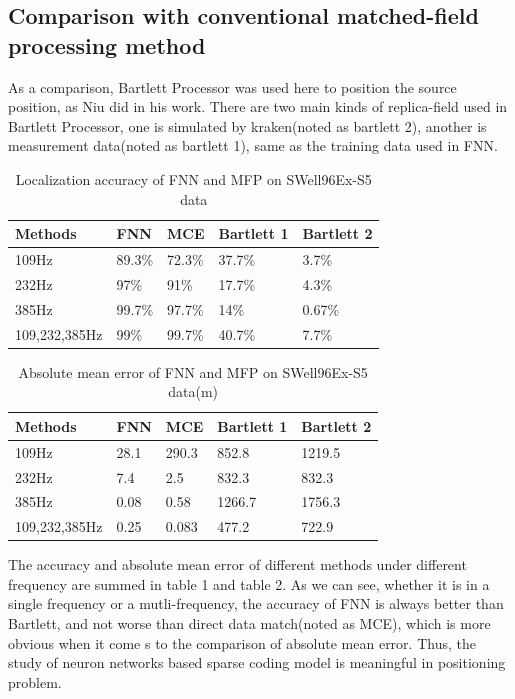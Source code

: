 \subsection{Comparison with conventional matched-field processing method}
As a comparison, Bartlett Processor was used here to position the source position, as Niu did in his work. There are two main kinds of replica-field used in Bartlett Processor, one is simulated by kraken(noted as bartlett 2), another is measurement data(noted as bartlett 1), same as the training data used in FNN.
\begin{table}[]
\caption{Localization accuracy of FNN and MFP on SWell96Ex-S5 data}
\label{my-label}
\begin{tabular}{@{}lllll@{}}
\toprule
Methods       & FNN    & MCE    & Bartlett 1 & Bartlett 2 \\ \midrule
109Hz         & 89.3\% & 72.3\% & 37.7\%     & 3.7\%      \\
232Hz         & 97\%   & 91\%   & 17.7\%     & 4.3\%      \\
385Hz         & 99.7\% & 97.7\% & 14\%       & 0.67\%     \\
109,232,385Hz & 99\%   & 99.7\% & 40.7\%     & 7.7\%      \\ \bottomrule
\end{tabular}
\end{table}

\begin{table}[]
\caption{Absolute mean error of FNN and MFP on SWell96Ex-S5 data(m)}
\label{my-label}
\begin{tabular}{@{}lllll@{}}
\toprule
Methods       & FNN  & MCE   & Bartlett 1 & Bartlett 2 \\ \midrule
109Hz         & 28.1 & 290.3 & 852.8      & 1219.5     \\
232Hz         & 7.4  & 2.5   & 832.3      & 832.3      \\
385Hz         & 0.08 & 0.58  & 1266.7     & 1756.3     \\
109,232,385Hz & 0.25 & 0.083 & 477.2      & 722.9      \\ \bottomrule
\end{tabular}
\end{table}

The accuracy and absolute mean error of different methods under different frequency are summed in table 1 and table 2. As we can see, whether it is in a single frequency or a mutli-frequency, the accuracy of FNN is always better than Bartlett, and not worse than direct data match(noted as MCE), which is more obvious when it come s to the comparison of absolute mean error. Thus, the study of neuron networks based sparse coding model is meaningful in positioning problem.

